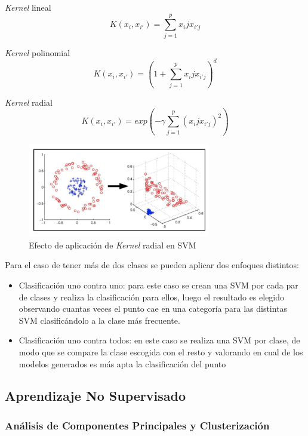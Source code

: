 \textit{Kernel} lineal
\begin{equation}
    K(x_i, x_{i'}) = \sum_{j=1}^{p} x_ij x_{i'j}
\end{equation}

\textit{Kernel} polinomial
\begin{equation}
    K(x_i, x_{i'}) = (1 + \sum_{j=1}^{p} x_ij x_{i'j})^d
\end{equation}

\textit{Kernel} radial
\begin{equation}
    K(x_i, x_{i'}) = exp(-\gamma \sum_{j=1}^{p} (x_ij x_{i'j})^2)
\end{equation}

\begin{figure}[H]
    \centering
    \includegraphics[width=8cm]{figs/svm_radial.png}
    \caption{Efecto de aplicación de \textit{Kernel} radial en SVM}
    \label{fig:svm_radial}
\end{figure}

Para el caso de tener más de dos clases se pueden aplicar dos enfoques distintos:

\begin{itemize}
    \item Clasificación uno contra uno: para este caso se crean una SVM por cada par de clases y realiza la clasificación para ellos, luego el resultado es elegido observando cuantas veces el punto cae en una categoría para las distintas SVM clasificándolo a la clase más frecuente.
    \item Clasificación uno contra todos: en este caso se realiza una SVM por clase, de modo que se compare la clase escogida con el resto y valorando en cual de los modelos generados es más apta la clasificación del punto
\end{itemize}

\subsection{Aprendizaje No Supervisado}
\subsubsection{Análisis de Componentes Principales y Clusterización}
